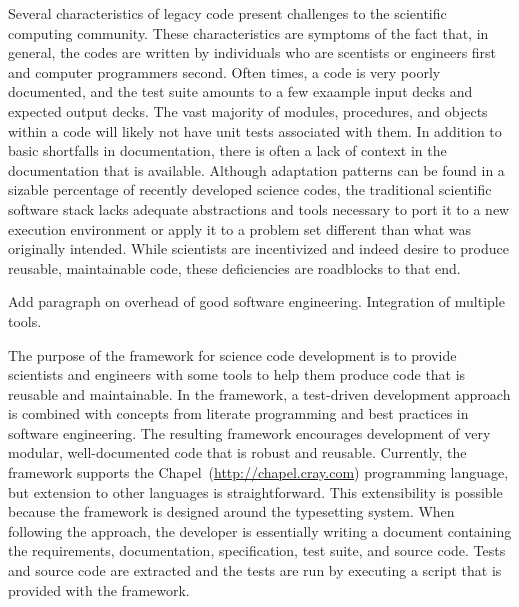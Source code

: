 \label{Tutorial_Introduction}

Several characteristics of legacy code present challenges to the scientific computing community. 
These characteristics are symptoms of the fact that, in general, the codes are written by individuals who are 
scentists or engineers first and computer programmers second. 
Often times, a code is very poorly documented, and the test suite amounts to a few exaample 
input decks and expected output decks. The vast majority of modules, procedures, and objects within a code
will likely not have unit tests associated with them. 
In addition to basic shortfalls in documentation, there is often a lack of context in the documentation that
is available.
Although adaptation patterns can be found in a sizable percentage of recently developed science codes, 
the traditional scientific software stack lacks adequate abstractions and tools necessary
to port it to a new execution environment or apply it to a problem set different than what was 
originally intended.\cite{kang}
While scientists are incentivized and indeed desire to produce reusable, maintainable code, these deficiencies 
are roadblocks to that end.\cite{petre} 

\begin{TODO}
  Add paragraph on overhead of good software engineering. Integration of multiple tools.
\end{TODO}

The purpose of the \seamless framework for science code development is to provide scientists and engineers
with some tools to help them produce code that is reusable and maintainable. 
In the \seamless framework, a test-driven development 
approach is combined with concepts from literate programming\cite{knuth} and 
best practices in software engineering. The resulting framework encourages development of very modular, 
well-documented code that is robust and reusable.  Currently, the framework supports 
the Chapel~(\url{http://chapel.cray.com}) programming language, but extension to other languages is 
straightforward.  This extensibility is possible because the framework is designed around the \latex
typesetting system. When following the \seamless approach, the developer is essentially writing a \latex
document containing the requirements, documentation, specification, test suite, and source code. Tests and 
source code are extracted and the tests are run by executing a script that is provided with the framework.

